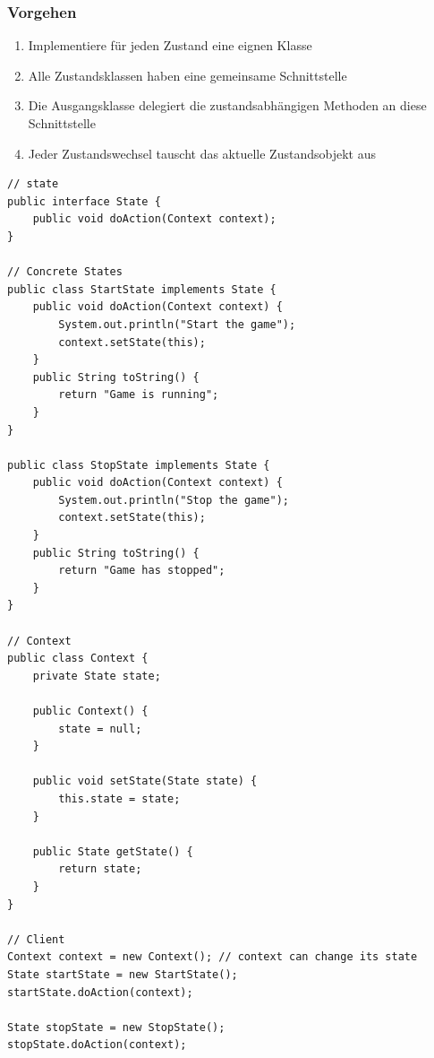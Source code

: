 \clearpage

\subsubsection{Vorgehen}
\begin{enumerate}
	\item Implementiere für jeden Zustand eine eignen Klasse
	\item Alle Zustandsklassen haben eine gemeinsame Schnittstelle
	\item Die Ausgangsklasse delegiert die zustandsabhängigen Methoden an diese Schnittstelle
	\item Jeder Zustandswechsel tauscht das aktuelle Zustandsobjekt aus
\end{enumerate}

\begin{lstlisting}
// state
public interface State {
	public void doAction(Context context);
}

// Concrete States
public class StartState implements State {
	public void doAction(Context context) {
		System.out.println("Start the game");
		context.setState(this);
	}
	public String toString() {
		return "Game is running";
	}
}

public class StopState implements State {
	public void doAction(Context context) {
		System.out.println("Stop the game");
		context.setState(this);
	}
	public String toString() {
		return "Game has stopped";
	}
}

// Context
public class Context {
	private State state;
	
	public Context() {
		state = null;
	}
	
	public void setState(State state) {
		this.state = state;
	}
	
	public State getState() {
		return state;
	}
}

// Client
Context context = new Context(); // context can change its state
State startState = new StartState();
startState.doAction(context);

State stopState = new StopState();
stopState.doAction(context);
\end{lstlisting}

\clearpage


